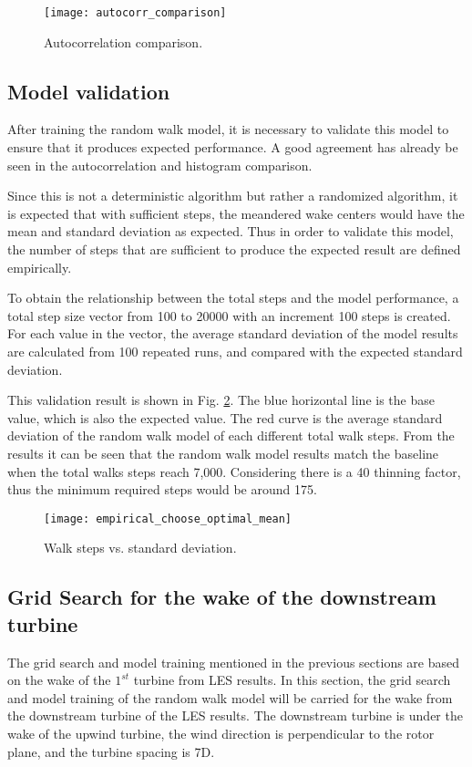 \documentclass{umthesis}
\begin{document}
\begin{figure}
  \centering
  \texttt{[image: autocorr\_comparison]}
  \caption{Autocorrelation comparison.}\label{fig:autocorr_comparison}
\end{figure}

\subsection{Model validation}
After training the random walk model, it is necessary to validate this model to ensure that it produces expected performance. A good agreement has already be seen in the autocorrelation and histogram comparison.

Since this is not a deterministic algorithm but rather a randomized algorithm, it is expected that with sufficient steps, the meandered wake centers would have the mean and standard deviation as expected. Thus in order to validate this model, the number of steps that are sufficient to produce the expected result are defined empirically.

To obtain the relationship between the total steps and the model performance, a total step size vector from 100 to 20000 with an increment 100 steps is created. For each value in the vector, the average standard deviation of the model results are calculated from 100 repeated runs, and compared with the expected standard deviation.

This validation result is shown in Fig. \ref{fig:empirical}. The blue horizontal line is the base value, which is also the expected value. The red curve is the average standard deviation of the random walk model of each different total walk steps. From the results it can be seen that the random walk model results match the baseline when the total walks steps reach 7,000. Considering there is a 40 thinning factor, thus the minimum required steps would be around 175. 

\begin{figure}
  \centering
  \texttt{[image: empirical\_choose\_optimal\_mean]}
  \caption{Walk steps vs. standard deviation.}\label{fig:empirical}
\end{figure}

\subsection{Grid Search for the wake of the downstream turbine}
The grid search and model training mentioned in the previous sections are based on the wake of the $1^{st}$ turbine from LES results. In this section, the grid search and model training of the random walk model will be carried for the wake from the downstream turbine of the LES results. The downstream turbine is under the wake of the upwind turbine, the wind direction is perpendicular to the rotor plane, and the turbine spacing is 7D. 
\end{document}
